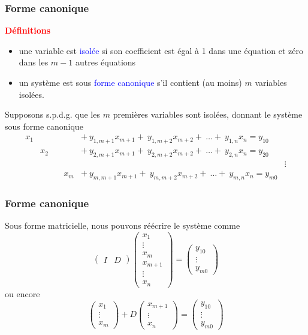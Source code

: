 \documentclass[t,usepdftitle=false]{beamer}
\begin{document}
\begin{frame}
\frametitle{Forme canonique}

\textbf{\textcolor{red}{Définitions}}
\begin{itemize}
\item
une variable est \textcolor{blue}{isolée} si son coefficient est égal à 1 dans une équation et zéro dans les $m-1$ autres équations
\item
un système est sous \textcolor{blue}{forme canonique} s'il contient (au moins) $m$ variables isolées.
\end{itemize}

Supposons s.p.d.g. que les $m$ premières variables sont isolées, donnant le système sous forme canonique
\[
\begin{matrix}
x_1 & & \ & & +\ y_{1,m+1}x_{m+1} +\ y_{1,m+2}x_{m+2} +\ \ldots +\ y_{1,n}x_{n} = y_{10} \\
& x_2 & & & +\ y_{2,m+1}x_{m+1} +\ y_{2,m+2}x_{m+2} +\ \ldots +\ y_{2,n}x_{n} = y_{20} \\
& & & & & \vdots \\
& & & x_m & +\ y_{m,m+1}x_{m+1} +\ y_{m,m+2}x_{m+2} +\ \ldots +\ y_{m,n}x_{n} = y_{m0}
\end{matrix}
\]
\end{frame}

\begin{frame}
\frametitle{Forme canonique}

Sous forme matricielle, nous pouvons réécrire le système comme
$$
\begin{pmatrix}
I &  D
\end{pmatrix}
\begin{pmatrix}
x_1 \\ \vdots \\ x_m \\ x_{m+1} \\ \vdots \\ x_n
\end{pmatrix} =
\begin{pmatrix}
y_{10} \\ \vdots \\ y_{m0}
\end{pmatrix}
$$
ou encore
$$
\begin{pmatrix}
x_1 \\ \vdots \\ x_m
\end{pmatrix}
+
D
\begin{pmatrix}
x_{m+1} \\ \vdots \\ x_n
\end{pmatrix} =
\begin{pmatrix}
y_{10} \\ \vdots \\ y_{m0}
\end{pmatrix}
$$
\end{frame}
\end{document}
